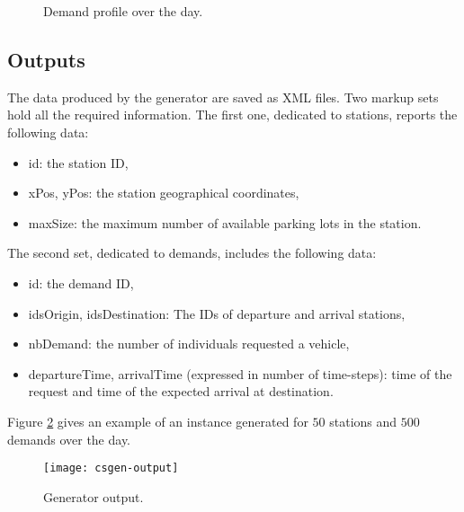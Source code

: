 \begin{bibunit}[ieeetr]
\begin{figure}[t]
\centering

\caption{Demand profile over the day.}
\label{fig:plotDemandProfile}
\end{figure}


\subsection{Outputs}

The data produced by the generator are saved as XML files.
Two markup sets hold all the required information.
The first one, dedicated to stations, reports the following data:
\begin{itemize}
\item id: the station ID,
\item xPos, yPos: the station geographical coordinates,
\item maxSize: the maximum number of available parking lots in the station.
\end{itemize}
The second set, dedicated to demands, includes the following data: 
\begin{itemize}
\item id: the demand ID,
\item idsOrigin, idsDestination: The IDs of departure and arrival stations,
\item nbDemand: the number of individuals requested a vehicle,
\item departureTime, arrivalTime (expressed in number of time-steps): time of the request and time of the expected arrival at destination.
\end{itemize}

Figure \ref{fig:csgen-output} gives an example of an instance generated for $50$ stations and $500$ demands over the day.


\begin{figure}[!h]
\centering
\texttt{[image: csgen-output]}
\caption{Generator output.}
\label{fig:csgen-output}
\end{figure}







\end{bibunit}
